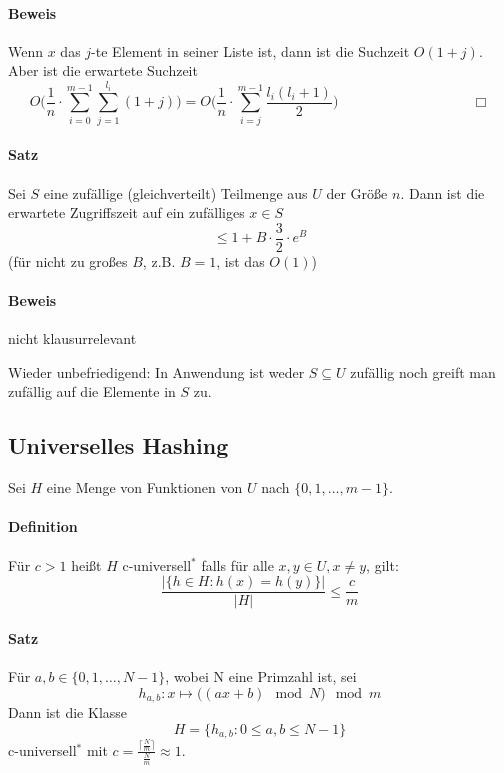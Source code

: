 \paragraph*{Beweis} Wenn $x$ das $j$-te Element in seiner Liste ist, dann ist die Suchzeit $O(1+j)$. Aber ist die erwartete Suchzeit $$ O\Big(\frac{1}{n} \cdot \sum\limits_{i=0}^{m-1} \sum\limits_{j=1}^{l_i} (1+j)\Big) = O\Big(\frac{1}{n} \cdot \sum\limits_{i=j}^{m-1} \frac{l_i(l_i+1)}{2}\Big) \hspace{4cm} \Box$$

\paragraph*{Satz} Sei $S$ eine zufällige (gleichverteilt) Teilmenge aus $U$ der Größe $n$. Dann ist die erwartete Zugriffszeit auf ein zufälliges $x \in S$ $$ \leq 1 + B \cdot \frac{3}{2} \cdot e^B $$ (für nicht zu großes $B$, z.B. $B=1$, ist das $O(1)$)

\paragraph*{Beweis} nicht klausurrelevant

\par\medskip
Wieder unbefriedigend: In Anwendung ist weder $S \subseteq U$ zufällig noch greift man zufällig auf die Elemente in $S$ zu.\par\medskip


\subsection{Universelles Hashing}
Sei $H$ eine Menge von Funktionen von $U$ nach $\{ 0,1,\dots,m-1 \}$.

\paragraph*{Definition} Für $c>1$ heißt $H$ c-universell$^*$ falls für alle $x,y \in U, x\not=y$, gilt:
$$ \frac{\big|\{ h \in H : h(x) = h(y) \}\big|}{|H|} \leq \frac{c}{m} $$

\paragraph*{Satz} Für $a,b \in \{ 0,1,\dots,N-1 \}$, wobei N eine Primzahl ist, sei $$h_{a,b}: x \mapsto \big( (ax+b) \mod N \big) \mod m$$ Dann ist die Klasse $$ H=\{ h_{a,b}: 0 \leq a,b \leq N-1 \} $$ c-universell$^*$ mit $c=\frac{\lceil\frac{N}{m}\rceil}{\frac{N}{m}} \approx 1$.

